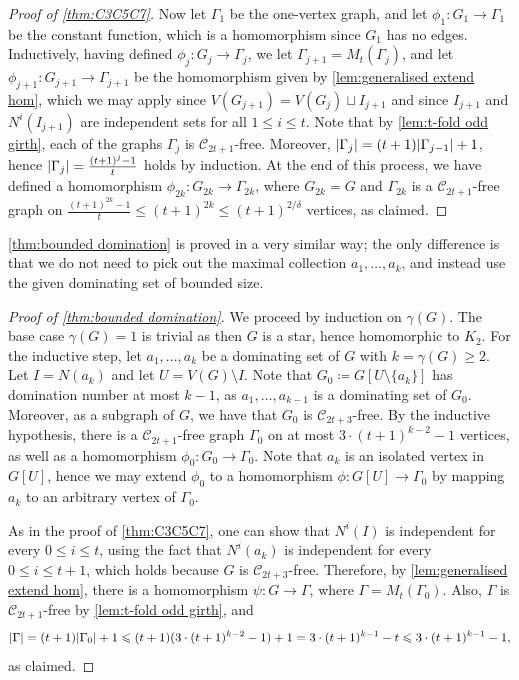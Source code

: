 \documentclass[reqno, english, 12pt]{amsart}
\theoremstyle{plain}
\theoremstyle{remark}
\DeclarePairedDelimiter{\abs}{\lvert}{\rvert}
\renewcommand{\leq}{\leqslant}
\renewcommand{\geq}{\geqslant}
\newcommand\C{\mathscr{C}}
\begin{document}
\begin{proof}[Proof of \cref{thm:C3C5C7}]
	Now let $\Gamma_1$ be the one-vertex graph, and let $\phi_1: G_1 \to \Gamma_1$ be the constant function, which is a homomorphism since $G_1$ has no edges. Inductively, having defined $\phi_j:G_j \to \Gamma_j$, we let $\Gamma_{j+1} = M_t({\Gamma_j})$, and let $\phi_{j+1}:G_{j+1} \to \Gamma_{j+1}$ be the homomorphism given by \cref{lem:generalised extend hom}, which we may apply since $V(G_{j+1}) = V(G_j) \sqcup I_{j+1}$ and since $I_{j+1}$ and $N^i(I_{j+1})$ are independent sets for all $1 \leq i \leq t$. Note that by \cref{lem:t-fold odd girth}, each of the graphs $\Gamma_j$ is $\C_{2t+1}$-free. Moreover, $\abs{\Gamma_{j}} = (t+1)\abs{\Gamma_{j-1}}+1$, hence $\abs{\Gamma_{j}} = \frac{(t+1)^{j}-1}{t}$ holds by induction. At the end of this process, we have defined a homomorphism $\phi_{2k}:G_{2k} \to \Gamma_{2k}$, where $G_{2k}=G$ and $\Gamma_{2k}$ is a $\C_{2t+1}$-free graph on $\frac{(t+1)^{2k}-1}{t} \leq (t+1)^{2k} \leq (t+1)^{2/\delta}$ vertices, as claimed. 
\end{proof}
\cref{thm:bounded domination} is proved in a very similar way; the only difference is that we do not need to pick out the maximal collection $a_1,\dots,a_k$, and instead use the given dominating set of \nolinebreak bounded \nolinebreak size.
\begin{proof}[Proof of \cref{thm:bounded domination}]
    We proceed by induction on $\gamma(G)$. The base case $\gamma(G)=1$ is trivial as then $G$ is a star, hence homomorphic to $K_2$. For the inductive step, let $a_1,\dots,a_k$ be a dominating set of $G$ with $k=\gamma(G) \geq 2$. Let $I = N(a_k)$ and let $U = V(G) \setminus I$. Note that $G_0 \coloneqq G[U \setminus \{a_k\}]$ has domination number at most $k-1$, as $a_1,\dots,a_{k-1}$ is a dominating set of $G_0$. Moreover, as a subgraph of $G$, we have that $G_0$ is $\C_{2t+3}$-free. By the inductive hypothesis, there is a $\C_{2t+1}$-free graph $\Gamma_0$ on at most $3 \cdot (t+1)^{k-2}-1$ vertices, as well as a homomorphism $\phi_0:G_0 \to \Gamma_0$. Note that $a_k$ is an isolated vertex in $G[U]$, hence we may extend $\phi_0$ to a homomorphism $\phi:G[U] \to \Gamma_0$ by mapping $a_k$ to an arbitrary vertex of $\Gamma_0$. 


    As in the proof of \cref{thm:C3C5C7}, one can show that $N^i(I)$ is independent for every $0 \leq i \leq t$, using the fact that $N^i(a_k)$ is independent for every $0 \leq i \leq t+1$, which holds because $G$ is $\C_{2t+3}$-free.
    Therefore, by \cref{lem:generalised extend hom}, there is a homomorphism $\psi:G \to \Gamma$, where $\Gamma = M_t({\Gamma_0})$. Also, $\Gamma$ is $\C_{2t+1}$-free by \cref{lem:t-fold odd girth}, and 
    \[
    \abs \Gamma = (t+1)\abs{\Gamma_0}+1 \leq (t+1)(3 \cdot (t+1)^{k-2}-1) + 1 = 3\cdot (t+1)^{k-1} -t \leq 3\cdot (t+1)^{k-1}-1,
    \]
    as claimed.
\end{proof}
\end{document}

